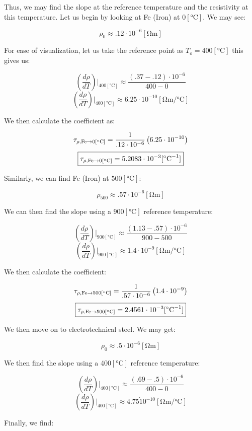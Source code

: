 \begin{enumerate}
    Thus, we may find the slope at the reference temperature and the resistivity at this temperature. Let us begin by looking at Fe (Iron) at $0[\si{\celsius}]$. We may see:

    $$\rho_0\approx .12\cdot10^{-6}[\si{\ohm\meter}]$$

    For ease of visualization, let us take the reference point as $T_o=400[\si{\celsius}]$ this gives us:

    $$\left( \frac{d\rho}{dT} \right)\Big|_{400[\si{\celsius}]}\approx \frac{(.37-.12)\cdot10^{-6}}{400-0}$$
  $$\left( \frac{d\rho}{dT} \right)\Big|_{400[\si{\celsius}]}\approx 6.25\cdot10^{-10}[\si{\ohm\meter\per\celsius}]$$

    We then calculate the coefficient as:

    $$\tau_{\rho,\ce{Fe}\to0[\si{\celsius}]}=\frac{1}{.12\cdot10^{-6}}\left( 6.25\cdot10^{-10} \right)$$
    $$\boxed{\tau_{\rho,\ce{Fe}\to0[\si{\celsius}]}=5.2083\cdot10^{-3}[\si{\per\celsius}]}$$

    Similarly, we can find Fe (Iron) at $500[\si{\celsius}]$:

    $$\rho_{500}\approx .57\cdot10^{-6}[\si{\ohm\meter}]$$

    We can then find the slope using a 900$[\si{\celsius}]$ reference temperature:

    $$\left( \frac{d\rho}{dT} \right)\Big|_{900[\si{\celsius}]}\approx \frac{(1.13-.57)\cdot10^{-6}}{900-500}$$
    $$\left( \frac{d\rho}{dT} \right)\Big|_{900[\si{\celsius}]}\approx 1.4\cdot10^{-9}[\si{\ohm\meter\per\celsius}]$$

  We then calculate the coefficient:

    $$\tau_{\rho,\ce{Fe}\to500[\si{\celsius}]}=\frac{1}{.57\cdot10^{-6}}\left( 1.4\cdot10^{-9} \right)$$
    $$\boxed{\tau_{\rho,\ce{Fe}\to500[\si{\celsius}]}=2.4561\cdot10^{-3}[\si{\per\celsius}]}$$

    We then move on to electrotechnical steel. We may get:

    $$\rho_{0}\approx .5\cdot10^{-6}[\si{\ohm\meter}]$$

    We then find the slope using a 400$[\si{\celsius}]$ reference temperature:

    $$\left( \frac{d\rho}{dT} \right)\Big|_{400[\si{\celsius}]}\approx \frac{(.69-.5)\cdot10^{-6}}{400-0}$$
    $$\left( \frac{d\rho}{dT} \right)\Big|_{400[\si{\celsius}]}\approx4.75\dot10^{-10}[\si{\ohm\meter\per\celsius}]$$

    Finally, we find:


\end{enumerate}
